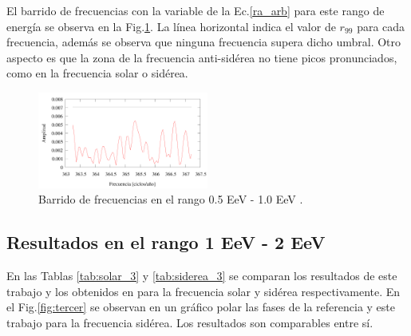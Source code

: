     El barrido de frecuencias con la variable de la Ec.\ref{ra_arb} para este rango de energía se observa en la Fig.\ref{fig:segundo_barrido}. La línea horizontal indica el valor de $r_{99}$ para cada frecuencia, además se observa que ninguna frecuencia supera dicho umbral. Otro aspecto es que la zona de la frecuencia anti-sidérea no tiene picos pronunciados, como en la frecuencia solar o sidérea.

    \begin{figure}[H]
        \begin{small}
            \begin{center}
                \includegraphics[width=0.5\textwidth]{plot_bin_2_barrido.pdf}
            \end{center}
            \caption{Barrido de frecuencias en el  rango 0.5 EeV - 1.0 EeV .}
            \label{fig:segundo_barrido}
        \end{small}
    \end{figure}    


\subsection*{Resultados en el rango 1 EeV - 2 EeV}

 
En las Tablas \ref{tab:solar_3} y \ref{tab:siderea_3} se comparan los resultados de este trabajo y los obtenidos en \cite{Aab_2020} para la frecuencia solar y sidérea respectivamente. En el Fig.\ref{fig:tercer} se observan en un gráfico polar las fases de la referencia y este trabajo para la frecuencia sidérea. Los resultados son comparables entre sí.
    
